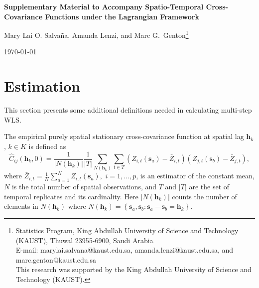 \documentclass[12pt]{article}
\newcommand{\0}{\mathbf{0}}
\begin{document}
\thispagestyle{empty} \baselineskip=28pt \vskip 5mm
\begin{center} {\Large{\bf Supplementary Material to Accompany Spatio-Temporal Cross-Covariance Functions under the Lagrangian Framework}}
	
\end{center}

\baselineskip=12pt \vskip 10mm

\begin{center}\large
Mary Lai O. Salva\~{n}a, Amanda Lenzi, and Marc G.~Genton\footnote[1]{
\baselineskip=10pt Statistics Program, King Abdullah University of Science and Technology (KAUST), Thuwal 23955-6900, Saudi Arabia\\
E-mail: marylai.salvana@kaust.edu.sa, amanda.lenzi@kaust.edu.sa, and marc.genton@kaust.edu.sa\\
This research was supported by the King Abdullah University of Science and Technology (KAUST).}
\end{center}

\baselineskip=17pt \vskip 10mm \centerline{\today} \vskip 15mm
\baselineskip=26pt

\section{Estimation}

This section presents some additional definitions needed in calculating multi-step WLS.

The empirical purely spatial stationary cross-covariance function at spatial lag $\mathbf{h}_k$, $k \in K$ is defined as
\begin{equation}
\widehat{C}_{ij}(\mathbf{h}_k,0)=\frac{1}{|N(\mathbf{h}_k)|}\frac{1}{|T|}\sum_{N(\mathbf{h}_k)}\sum_{t\in T}\left(Z_{i,t}(\mathbf{s}_a)-\bar{Z}_{i,t}\right)\left(Z_{j,t}(\mathbf{s}_b)-\bar{Z}_{j,t}\right),
\label{empirical_spatial_covariance}
\end{equation}
where $\bar{Z}_{i,t}=\frac{1}{N}\sum_{a=1}^{N} Z_{i,t}(\mathbf{s}_a),$ $i=1,\ldots,p$, is an estimator of the constant mean, $N$ is the total number of spatial observations, and $T$ and $|T|$ are the set of temporal replicates and its cardinality. Here $|N(\mathbf{h}_k)|$ counts the number of elements in $N(\mathbf{h}_k)$ where $N(\mathbf{h}_k)=\left\{\mathbf{s}_a,\mathbf{s}_b: \mathbf{s}_a-\mathbf{s}_b =\mathbf{h}_k \right\}$.
\end{document}
